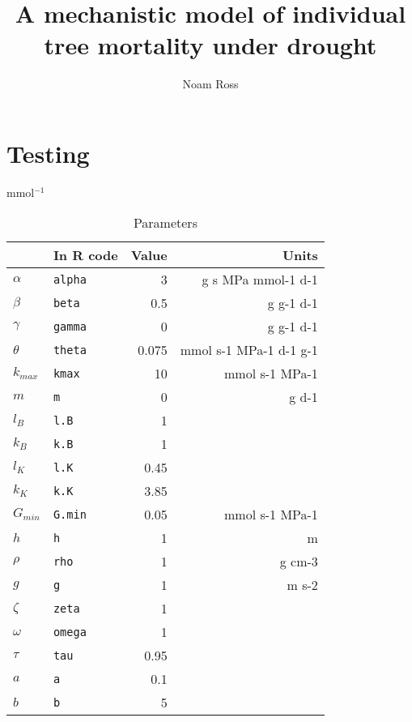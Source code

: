 \documentclass[12pt]{amsart}
\title{A mechanistic model of individual tree mortality under drought}
\author{Noam Ross}
\begin{document}


\maketitle


\section{Testing}

mmol$^{-1}$
\begin{table}[ht]
\begin{center}
\begin{tabular}{llrr}
  \hline
 & In R code & Value & Units \\ 
  \hline
$\alpha$ & \texttt{alpha} & 3 & g s MPa mmol-1 d-1 \\ 
  $\beta$ & \texttt{beta} & 0.5 & g g-1 d-1 \\ 
  $\gamma$ & \texttt{gamma} & 0 & g g-1 d-1 \\ 
  $\theta$ & \texttt{theta} & 0.075 & mmol s-1 MPa-1 d-1 g-1 \\ 
  $k_{max}$ & \texttt{kmax} & 10 & mmol s-1 MPa-1 \\ 
  $m$ & \texttt{m} & 0 & g d-1 \\ 
  $l_B$ & \texttt{l.B} & 1 &  \\ 
  $k_B$ & \texttt{k.B} & 1 &  \\ 
  $l_K$ & \texttt{l.K} & 0.45 &  \\ 
  $k_K$ & \texttt{k.K} & 3.85 &  \\ 
  $G_{min}$ & \texttt{G.min} & 0.05 & mmol s-1 MPa-1 \\ 
  $h$ & \texttt{h} & 1 & m \\ 
  $\rho$ & \texttt{rho} & 1 & g cm-3 \\ 
  $g$ & \texttt{g} & 1 & m s-2 \\ 
  $\zeta$ & \texttt{zeta} & 1 &  \\ 
  $\omega$ & \texttt{omega} & 1 &  \\ 
  $\tau$ & \texttt{tau} & 0.95 &  \\ 
  $a$ & \texttt{a} & 0.1 &  \\ 
  $b$ & \texttt{b} & 5 &  \\ 
   \hline
\end{tabular}
\caption{Parameters}
\end{center}
\end{table}
\end{document}
